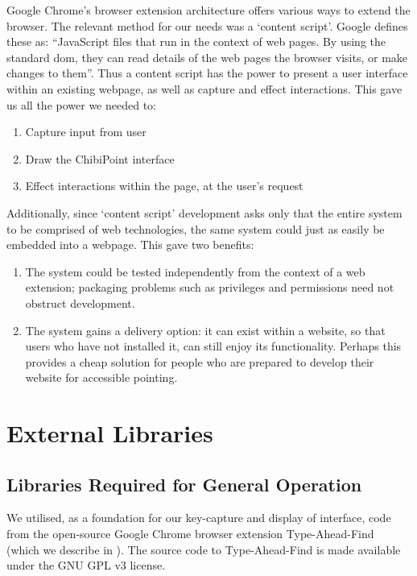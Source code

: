 \documentclass[11pt,openright,a4paper]{report}
\begin{document}
Google Chrome's browser extension architecture offers various ways to extend the browser. The relevant method for our needs was a `content script'\cite{contentscript}. Google defines these as: ``JavaScript files that run in the context of web pages. By using the standard \gls{dom}, they can read details of the web pages the browser visits, or make changes to them''.
Thus a content script has the power to present a user interface within an existing webpage, as well as capture and effect interactions. This gave us all the power we needed to:

\begin{enumerate}
\item Capture input from user
\item Draw the ChibiPoint interface
\item Effect interactions within the page, at the user's request
\end{enumerate}

Additionally, since `content script' development asks only that the entire system to be comprised of web technologies, the same system could just as easily be embedded into a webpage. This gave two benefits:

\begin{enumerate}
\item The system could be tested independently from the context of a web extension; packaging problems such as privileges and permissions need not obstruct development.
\item The system gains a delivery option: it can exist within a website, so that users who have not installed it, can still enjoy its functionality. Perhaps this provides a cheap solution for people who are prepared to develop their website for accessible pointing.
\end{enumerate}

\section{External Libraries}
\subsection{Libraries Required for General Operation}
We utilised, as a foundation for our key-capture and display of interface, code from the open-source Google Chrome browser extension Type-Ahead-Find~\cite{typeaheadfind,typeaheadfindsource} (which we describe in ). The source code to Type-Ahead-Find is made available under the GNU GPL v3\cite{gnugpl} license.
\end{document}
